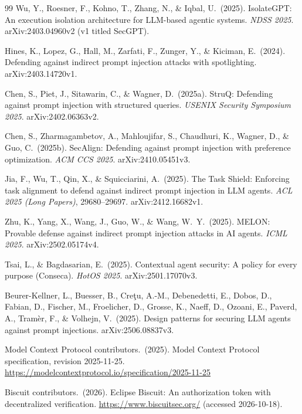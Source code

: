 \documentclass[10pt,twocolumn]{article}
\begin{document}
\begin{thebibliography}{99}
Wu, Y., Roesner, F., Kohno, T., Zhang, N., \& Iqbal, U.\ (2025).
IsolateGPT: An execution isolation architecture for LLM-based agentic
systems.
\emph{NDSS 2025}. arXiv:2403.04960v2 (v1 titled SecGPT).

Hines, K., Lopez, G., Hall, M., Zarfati, F., Zunger, Y., \& Kiciman, E.\ (2024).
Defending against indirect prompt injection attacks with spotlighting.
arXiv:2403.14720v1.

Chen, S., Piet, J., Sitawarin, C., \& Wagner, D.\ (2025a).
StruQ: Defending against prompt injection with structured queries.
\emph{USENIX Security Symposium 2025}. arXiv:2402.06363v2.

Chen, S., Zharmagambetov, A., Mahloujifar, S., Chaudhuri, K., Wagner, D.,
\& Guo, C.\ (2025b).
SecAlign: Defending against prompt injection with preference optimization.
\emph{ACM CCS 2025}. arXiv:2410.05451v3.

Jia, F., Wu, T., Qin, X., \& Squicciarini, A.\ (2025).
The Task Shield: Enforcing task alignment to defend against indirect prompt
injection in LLM agents.
\emph{ACL 2025 (Long Papers)}, 29680--29697. arXiv:2412.16682v1.

Zhu, K., Yang, X., Wang, J., Guo, W., \& Wang, W.~Y.\ (2025).
MELON: Provable defense against indirect prompt injection attacks in AI
agents.
\emph{ICML 2025}. arXiv:2502.05174v4.

Tsai, L., \& Bagdasarian, E.\ (2025).
Contextual agent security: A policy for every purpose (Conseca).
\emph{HotOS 2025}. arXiv:2501.17070v3.

Beurer-Kellner, L., Buesser, B., Cre\c{t}u, A.-M., Debenedetti, E., Dobos, D.,
Fabian, D., Fischer, M., Froelicher, D., Grosse, K., Naeff, D., Ozoani, E.,
Paverd, A., Tram\`er, F., \& Volhejn, V.\ (2025).
Design patterns for securing LLM agents against prompt injections.
arXiv:2506.08837v3.

Model Context Protocol contributors.\ (2025).
Model Context Protocol specification, revision 2025-11-25.
\url{https://modelcontextprotocol.io/specification/2025-11-25}

Biscuit contributors.\ (2026).
Eclipse Biscuit: An authorization token with decentralized verification.
\url{https://www.biscuitsec.org/} (accessed 2026-10-18).


\end{thebibliography}
\end{document}
